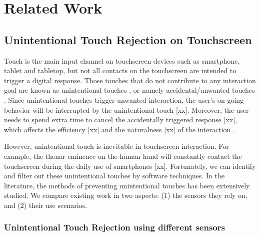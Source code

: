 \section{Related Work}

\subsection{Unintentional Touch Rejection on Touchscreen}

Touch is the main input channel on touchscreen devices such as smartphone, tablet and tabletop, but not all contacts on the touchscreen are intended to trigger a digital response. Those touches that do not contribute to any interaction goal are known as unintentional touches \cite{2020-TabletopTouch}, or namely accidental/unwanted touches \cite{2015-GestureOn,2012-IdentifyUnint}. Since unintentional touches trigger unwanted interaction, the user's on-going behavior will be interrupted by the unintentional touch [xx]. Moreover, the user needs to spend extra time to cancel the accidentally triggered response [xx], which affects the efficiency [xx] and the naturalness [xx] of the interaction \cite{2014-PenMightier, 2020-TabletopTouch}.

However, unintentional touch is inevitable in touchscreen interaction. For example, the thenar eminence on the human hand will constantly contact the touchscreen during the daily use of smartphones [xx]. Fortunately, we can identify and filter out these unintentional touches by software techniques. In the literature, the methods of preventing unintentional touches has been extensively studied. We compare existing work in two aspects: (1) the sensors they rely on, and (2) their use scenarios.

\subsubsection{Unintentional Touch Rejection using different sensors}

